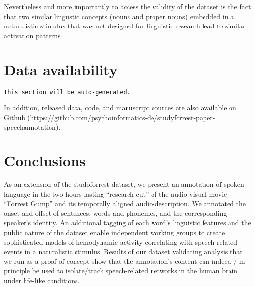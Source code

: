 \documentclass[10pt,a4paper,onecolumn]{article}
\begin{document}
Nevertheless and more importantly to access the validity of the dataset is the fact that two similar lingustic concepts (nouns and proper nouns) embedded in a naturalistic stimulus that was not designed for linguistic research lead to similar activation patterns

\section*{Data availability}
\texttt{This section will be auto-generated.}

In addition, released data, code, and manuscript sources are also available on
Github (\url{https://github.com/psychoinformatics-de/studyforrest-paper-speechannotation}).

\section*{Conclusions}
As an extension of the studoforrest dataset, we present an annotation of spoken language in the two hours lasting ``research cut'' of the audio-visual movie ``Forrest Gump'' and its temporally aligned audio-description.
We annotated the onset and offset of sentences, words and phonemes, and the corresponding speaker's identity.
An additional tagging of each word's linguistic features and the public nature of the dataset enable independent working groups to create sophisticated models of hemodynamic activity correlating with speech-related events in a naturalistic stimulus.
Results of our dataset validating analysis that we run as a proof of concept show that the annotation's content can indeed / in principle be used to isolate/track speech-related networks in the human brain under life-like conditions.
\end{document}
